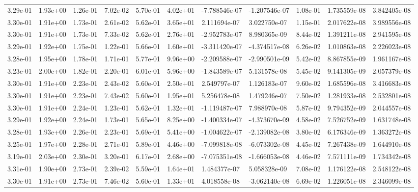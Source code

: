 \begin{longtable}{| p{} | p{} |}
3.29e-01 & 1.93e+00 & 1.26e-01 & 7.02e-02 & 5.70e-01 & 4.02e+01 & -7.788546e-07 & -1.207546e-07 &  1.08e-01 &  1.735559e-08 &  3.842405e-08 \\
3.30e-01 & 1.91e+00 & 1.73e-01 & 2.61e-02 & 5.62e-01 & 3.65e+01 &  2.111694e-07 &  3.022750e-07 &  1.15e-01 &  2.017622e-08 &  3.989556e-08 \\
3.30e-01 & 1.91e+00 & 1.73e-01 & 7.33e-02 & 5.62e-01 & 2.76e+01 & -2.952783e-07 &  8.980365e-09 &  8.44e-02 &  1.391211e-08 &  2.941595e-08 \\
3.29e-01 & 1.92e+00 & 1.75e-01 & 1.22e-01 & 5.66e-01 & 1.60e+01 & -3.311420e-07 & -4.374517e-08 &  6.26e-02 &  1.010863e-08 &  2.226023e-08 \\
3.28e-01 & 1.95e+00 & 1.78e-01 & 1.71e-01 & 5.77e-01 & 9.96e+00 & -2.209588e-07 & -2.990501e-09 &  5.42e-02 &  8.867855e-09 &  1.961167e-08 \\
3.23e-01 & 2.00e+00 & 1.82e-01 & 2.20e-01 & 6.01e-01 & 5.96e+00 & -1.843589e-07 &  5.131578e-08 &  5.45e-02 &  9.141305e-09 &  2.057379e-08 \\
3.30e-01 & 1.91e+00 & 2.23e-01 & 2.43e-02 & 5.60e-01 & 2.50e+01 &  2.549797e-07 &  1.126183e-07 &  9.60e-02 &  1.685596e-08 &  3.416683e-08 \\
3.30e-01 & 1.91e+00 & 2.23e-01 & 7.43e-02 & 5.60e-01 & 1.95e+01 &  5.256478e-08 &  1.479246e-07 &  7.50e-02 &  1.281933e-08 &  2.532801e-08 \\
3.30e-01 & 1.91e+00 & 2.24e-01 & 1.23e-01 & 5.62e-01 & 1.32e+01 & -1.119487e-07 &  7.988970e-08 &  5.87e-02 &  9.794352e-09 &  2.044557e-08 \\
3.29e-01 & 1.92e+00 & 2.24e-01 & 1.73e-01 & 5.65e-01 & 8.25e+00 & -1.400334e-07 & -4.373670e-09 &  4.58e-02 &  7.526752e-09 &  1.631748e-08 \\
3.28e-01 & 1.93e+00 & 2.26e-01 & 2.23e-01 & 5.69e-01 & 5.41e+00 & -1.004622e-07 & -2.139082e-08 &  3.80e-02 &  6.176346e-09 &  1.363272e-08 \\
3.25e-01 & 1.97e+00 & 2.28e-01 & 2.71e-01 & 5.89e-01 & 4.46e+00 & -7.099818e-08 & -6.073302e-08 &  4.45e-02 &  7.267438e-09 &  1.644910e-08 \\
3.19e-01 & 2.03e+00 & 2.30e-01 & 3.20e-01 & 6.17e-01 & 2.68e+00 & -7.075351e-08 & -1.666053e-08 &  4.46e-02 &  7.571111e-09 &  1.734342e-08 \\
3.31e-01 & 1.90e+00 & 2.73e-01 & 2.39e-02 & 5.59e-01 & 1.64e+01 &  1.484377e-07 &  5.058328e-09 &  7.08e-02 &  1.176122e-08 &  2.548122e-08 \\
3.30e-01 & 1.91e+00 & 2.73e-01 & 7.46e-02 & 5.60e-01 & 1.33e+01 &  4.018558e-08 & -3.062140e-08 &  6.69e-02 &  1.226051e-08 &  2.346099e-08 \\

\end{longtable}
